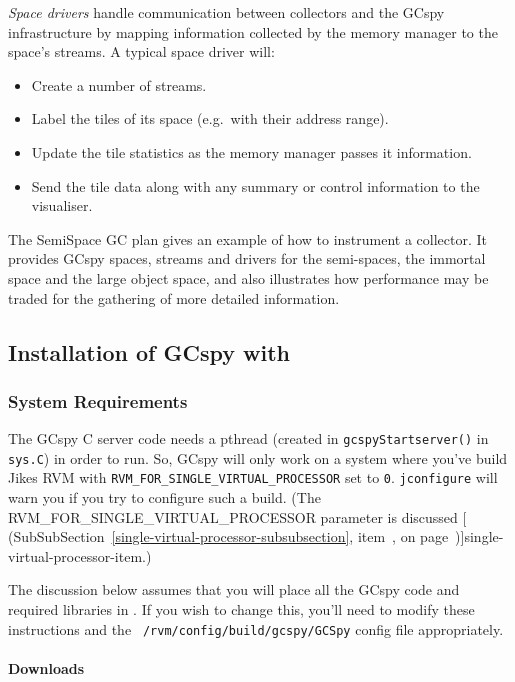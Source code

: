 \textit{Space drivers} handle communication between collectors and the GCspy
infrastructure by mapping information collected by the memory manager
to the space's streams.  A typical space driver will:

\begin{itemize}
   \item Create a number of streams.
   \item Label the tiles of its space (e.g.\ with their address range).
   \item Update the tile statistics as the memory manager passes it information.
   \item Send the tile data along with any summary or control information to the visualiser. 
\end{itemize}

The \jrvm{} SemiSpace GC plan gives an example of how to instrument a
collector.  It provides GCspy spaces, streams and drivers for the
semi-spaces, the immortal space and the large object space, and also
illustrates how performance may be traded for the gathering of more
detailed information.

\subsection{Installation of GCspy with \jrvm{}}


\subsubsection{System Requirements}

The GCspy C server code needs a pthread (created in
\texttt{gcspyStartserver()} in \texttt{sys.C}) in order to run.
So, GCspy will only work on a system where you've build Jikes RVM with
\texttt{RVM\_FOR\_SINGLE\_VIRTUAL\_PROCESSOR} set to \texttt{0}.
\texttt{jconfigure} will warn you if you try to configure such a build.
(The RVM\_FOR\_SINGLE\_VIRTUAL\_PROCESSOR parameter is discussed
  [
  (SubSubSection~\ref{single-virtual-processor-subsubsection},
  item~\Ref, on page~\Pageref)]{single-virtual-processor-item}.)

The discussion below assumes that you will place all the
GCspy code and required libraries in \rvmRoot.  If you wish to change
this, you'll need to modify these instructions and the {\tt
  \rvmRoot/rvm/config/build/gcspy/GCSpy} config file appropriately. 

\paragraph{Downloads}

